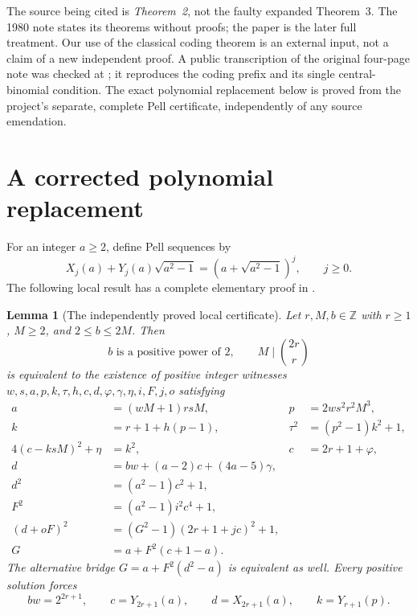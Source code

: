 \documentclass[11pt]{article}
\newtheorem{lemma}[theorem]{Lemma}
\newcommand{\Z}{\mathbb Z}\newcommand{\Q}{\mathbb Q}
\begin{document}
The source being cited is \emph{Theorem~2}, not the faulty expanded
Theorem~3. The 1980 note states its theorems without proofs; the
paper \cite{Jones82} is the later full treatment. Our use of the
classical coding theorem is an external input, not a claim of a new
independent proof. A public transcription of the original four-page
note was checked at \cite{Transcription}; it reproduces the coding
prefix and its single central-binomial condition. The exact polynomial
replacement below is proved from the project's separate, complete Pell
certificate, independently of any source emendation.

\section{A corrected polynomial replacement}

For an integer \(a\ge2\), define Pell sequences by
\[
 X_j(a)+Y_j(a)\sqrt{a^2-1}
       =(a+\sqrt{a^2-1})^j,\qquad j\ge0.
\]
The following local result has a complete elementary proof in
\cite[Theorem~1]{Binomial}.

\begin{lemma}[The independently proved local certificate]\label{local}
Let \(r,M,b\in\Z\) with \(r\ge1\), \(M\ge2\), and
\(2\le b\le2M\). Then
\[
 b\text{ is a positive power of }2,
 \qquad M\mid\binom{2r}{r}
\]
is equivalent to the existence of positive integer witnesses
\(w,s,a,p,k,\tau,h,c,d,\varphi,\gamma,\eta,i,F,j,o\)
satisfying
\begin{align}
 a&=(wM+1)rsM,&p&=2ws^2r^2M^3,\label{ap}\\
 k&=r+1+h(p-1),&\tau^2&=(p^2-1)k^2+1,\label{small}\\
 4(c-ksM)^2+\eta&=k^2,&c&=2r+1+\varphi,\label{close}\\
 d&=bw+(a-2)c+(4a-5)\gamma,\label{linear}\\
 d^2&=(a^2-1)c^2+1,\label{norm1}\\
 F^2&=(a^2-1)i^2c^4+1,\label{norm2}\\
 (d+oF)^2&=(G^2-1)(2r+1+jc)^2+1,\label{norm3}\\
 G&=a+F^2(c+1-a).\label{bridge}
\end{align}
The alternative bridge \(G=a+F^2(d^2-a)\) is equivalent as
well. Every positive solution forces
\[
 bw=2^{2r+1},\qquad c=Y_{2r+1}(a),\qquad d=X_{2r+1}(a),
 \qquad k=Y_{r+1}(p).
\]
\end{lemma}
\end{document}
